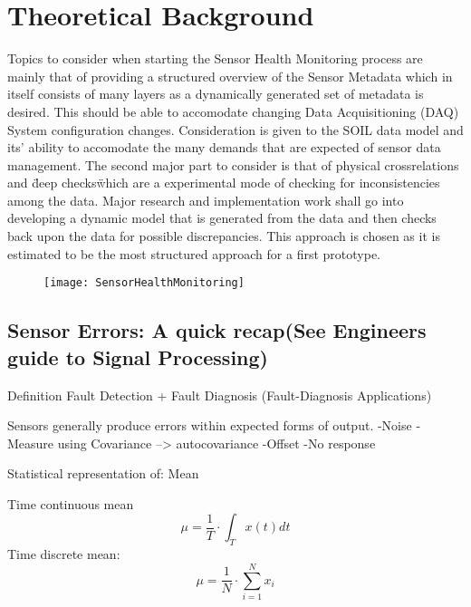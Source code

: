 \chapter{Theoretical Background}

Topics to consider when starting the Sensor Health Monitoring process are mainly that of providing a structured
overview of the Sensor Metadata which in itself consists of many layers as a dynamically generated set of metadata is
desired. This should be able to accomodate changing Data Acquisitioning (DAQ) System configuration changes.
Consideration is given to the SOIL data model and its' ability to accomodate the many demands that are expected of
sensor data management. \cite{Bodenbenner.2021}
The second major part to consider is that of physical crossrelations and \"deep checks\" which are a experimental mode of checking for inconsistencies among the data.
Major research and implementation work shall go into developing a dynamic model that is generated from the data and then checks back upon the data for possible discrepancies. This approach is chosen as it is estimated to be the most structured approach for a first prototype.



\begin{figure}[h]
         \centering
         \texttt{[image: SensorHealthMonitoring]}
         \caption{}
         \label{fig:}
\end{figure}



\section{Sensor Errors: A quick recap(See Engineers guide to Signal Processing)}
Definition Fault Detection + Fault Diagnosis (Fault-Diagnosis Applications)


Sensors generally produce errors within expected forms of output.
-Noise
    -Measure using Covariance --> autocovariance
-Offset
-No response

Statistical representation of:
Mean

\cite[S.13-17]{Smith.2006}

Time continuous mean
\begin{equation}
    \label{eq:mean_cont}
    \mu=\frac{1}{T} \cdot \int_T x(t) d t
\end{equation}
Time discrete mean:
\begin{equation}
    \label{eq:mean_disc}
\mu=\frac{1}{N} \cdot \sum_{i=1}^{N} x_i
\end{equation}




